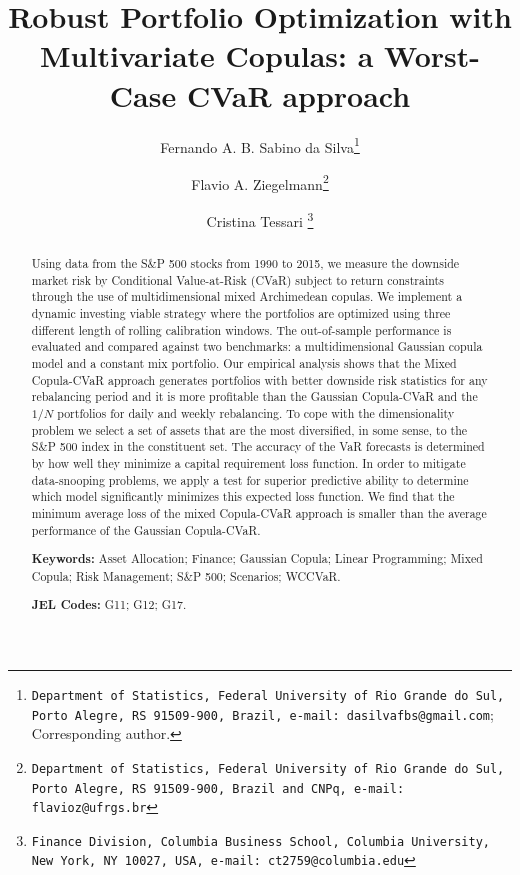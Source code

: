 \documentclass[a4paper,10pt]{article}
\begin{document}
\title{Robust Portfolio Optimization with Multivariate Copulas: a Worst-Case CVaR approach}
\author[]{ Fernando A. B. Sabino da Silva\thanks{\texttt{Department of Statistics, Federal University of Rio Grande do Sul, Porto Alegre, RS 91509-900, Brazil, e-mail: dasilvafbs@gmail.com}; Corresponding author.}}
\author[]{Flavio A. Ziegelmann\thanks{\texttt{Department of Statistics, Federal University of Rio Grande do Sul, Porto Alegre, RS 91509-900, Brazil and CNPq, e-mail: flavioz@ufrgs.br}}}
\author[]{Cristina Tessari \thanks{\texttt{Finance Division, Columbia Business School, Columbia University, New York, NY 10027, USA,
			e-mail: ct2759@columbia.edu}}}
\affil[]{}
\date{}
\maketitle

\begin{abstract}
Using data from the S\&P 500 stocks from 1990 to 2015, we measure the downside market risk by Conditional Value-at-Risk (CVaR) subject to return constraints through the use of multidimensional mixed Archimedean copulas. We implement a dynamic investing viable strategy where the portfolios are optimized using three different length of rolling calibration windows. The out-of-sample performance is evaluated and compared against two benchmarks: a multidimensional Gaussian copula model and a constant mix portfolio. Our empirical analysis shows that the Mixed Copula-CVaR approach generates portfolios with better downside risk statistics for any rebalancing period and it is more profitable than the Gaussian Copula-CVaR and the $1/N$ portfolios for daily and weekly rebalancing. To cope with the dimensionality problem we select a set of assets that are the most diversified, in some sense, to the S\&P 500 index in the constituent set. The accuracy of the VaR forecasts is determined by how well they minimize a capital requirement loss function. In order to mitigate data-snooping problems, we apply a test for superior predictive ability to determine which model significantly minimizes this expected loss function. We find that the minimum average loss of the mixed Copula-CVaR approach is smaller than the average performance of the Gaussian Copula-CVaR.


\smallskip

\smallskip

\noindent \textbf{Keywords:} Asset Allocation; Finance; Gaussian Copula; Linear Programming; Mixed Copula; Risk Management; S\&P 500; Scenarios; WCCVaR.

\noindent \textbf{JEL Codes:} G11; G12; G17.
\end{abstract}
\end{document}
